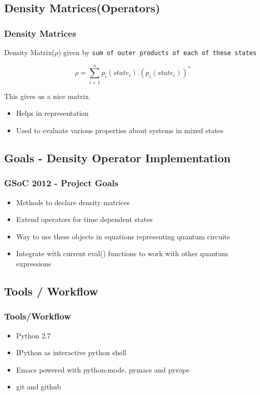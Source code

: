 \documentclass[dvips]{beamer}
\begin{document}
\subsection {Density Matrices(Operators)}
\begin{frame}
\frametitle{Density Matrices}


Density Matrix($\rho$) given by
\newline
\texttt{sum of outer products of each of these states}

\[\rho =  \sum_{i=1}^{n} p_i(state_i) .  (p_i(state_i))^* \]

\pause
This gives us a nice matrix. \newline
\begin{itemize}
\item Helps in representation
\item Used to evaluate various properties about systems in mixed states
\end{itemize}


\end{frame}

\subsection {  Goals - Density Operator Implementation }
\begin{frame}
\frametitle{GSoC 2012 - Project Goals }

\begin{itemize}
\item Methods to declare density matrices
\item Extend operators for time dependent states
\item Way to use these objects in equations representing quantum circuits
\item Integrate with current eval() functions to work with other quantum
  expressions
\end{itemize}

\end{frame}

\subsection {  Tools / Workflow }
\begin{frame}
\frametitle{Tools/Workflow}
\begin{itemize}
\item Python 2.7
\item IPython as interactive python shell
\item Emacs powered with python-mode, pymacs and pyrope
\item git and github
\end{itemize}

\end{frame}
\end{document}
